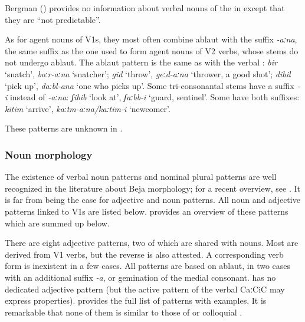 \documentclass[output=paper]{langsci/langscibook}
\begin{document}
Bergman (\citeyear[35]{Bergman2002}) provides no information about verbal nouns of the  in   except that they are “not predictable”. 

As for agent nouns of V1s, they most often combine ablaut with the suffix \textit{\nobreakdash-aːna}, the same suffix as the one used to form agent nouns of V2 verbs, whose stems do not undergo ablaut. The ablaut pattern is the same as with the verbal  : \textit{bir} ‘snatch’, \textit{boːr-aːna} ‘snatcher’; \textit{gid} ‘throw’,\textbf{ }\textit{geːd-aːna} ‘thrower, a good shot’; \textit{dibil} ‘pick up’, \textit{daːbl-ana} ‘one who picks up’. Some tri-consonantal stems have a suffix \textit{{}-i} instead of \textit{\nobreakdash-aːna}:  \textit{ʃibib} ‘look at’, \textit{ʃaːbb\nobreakdash-i} ‘guard, sentinel'. Some have both suffixes: \textit{kitim} ‘arrive’, \textit{kaːtm-aːna/kaːtim-i} ‘newcomer’.

These patterns are unknown in .
 \subsubsection{Noun morphology}

The existence of verbal noun  patterns and nominal plural patterns are well recognized in the literature about Beja morphology; for a recent overview, see \citet{Appleyard2007}. It is far from being the case for adjective and noun patterns. All noun and adjective patterns linked to V1s are listed below. \citet{Vanhove2012} provides an overview of these patterns which are summed up below.

There are eight adjective patterns, two of which are shared with nouns. Most are derived from V1 verbs, but the reverse is also attested. A corresponding verb form is inexistent in a few cases. All patterns are based on ablaut, in two cases with an additional suffix \textit{\nobreakdash-a}, or gemination of the medial consonant.  has no dedicated adjective pattern (but the active  pattern of the verbal  CaːCiC may express properties).  provides the full list of patterns with examples. It is remarkable that none of them is similar to those of   or colloquial   \citep[17]{Bergman2002}.
\end{document}
